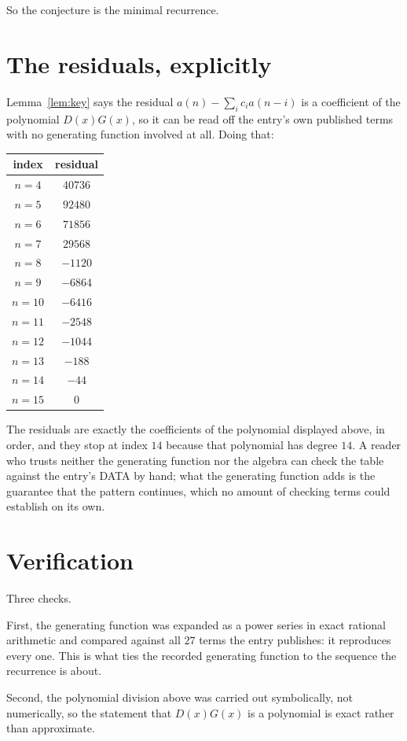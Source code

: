 \documentclass[11pt,a4paper]{article}
\theoremstyle{plain}
\theoremstyle{definition}
\begin{document}
So the conjecture is the minimal recurrence.

\section{The residuals, explicitly}

Lemma~\ref{lem:key} says the residual $a(n)-\sum_ic_ia(n-i)$ is a coefficient of the
polynomial $D(x)G(x)$, so it can be read off the entry's own published terms with no
generating function involved at all. Doing that:
\begin{center}
\begin{tabular}{cc}
index & residual \\ \hline
$n=4$ & $40736$ \\
$n=5$ & $92480$ \\
$n=6$ & $71856$ \\
$n=7$ & $29568$ \\
$n=8$ & $-1120$ \\
$n=9$ & $-6864$ \\
$n=10$ & $-6416$ \\
$n=11$ & $-2548$ \\
$n=12$ & $-1044$ \\
$n=13$ & $-188$ \\
$n=14$ & $-44$ \\
$n=15$ & $0$
\end{tabular}
\end{center}
The residuals are exactly the coefficients of the polynomial displayed above, in order, and
they stop at index $14$ because that polynomial has degree $14$. A reader who trusts
neither the generating function nor the algebra can check the table against the entry's DATA
by hand; what the generating function adds is the guarantee that the pattern continues, which
no amount of checking terms could establish on its own.

\section{Verification}

Three checks.

First, the generating function was expanded as a power series in exact rational arithmetic and
compared against all $27$ terms the entry publishes: it reproduces every one. This is
what ties the recorded generating function to the sequence the recurrence is about.

Second, the polynomial division above was carried out symbolically, not numerically, so the
statement that $D(x)G(x)$ is a polynomial is exact rather than approximate.
\end{document}
